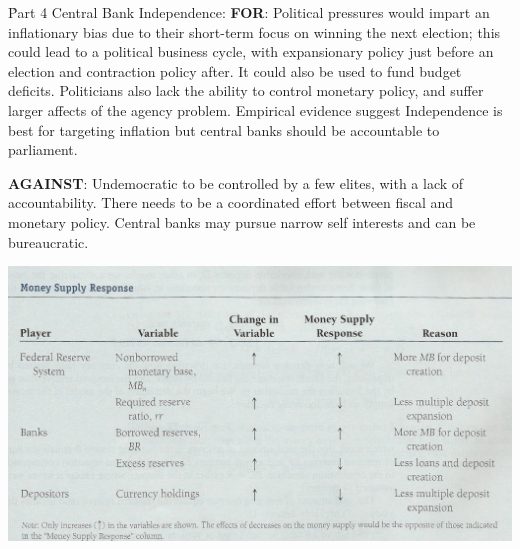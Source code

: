 \documentclass[12pt]{examnotes}
\begin{document}
\h{Part 4}
Central Bank Independence:
\textbf{FOR}: Political pressures would impart an inflationary bias due to their short-term focus on winning the next election; this could lead to a political business cycle, with expansionary policy just before an election and contraction policy after. It could also be used to fund budget deficits. Politicians also lack the ability to control monetary policy, and suffer larger affects of the agency problem. Empirical evidence suggest Independence is best for targeting inflation but central banks should be accountable to parliament.

\textbf{AGAINST}: 
Undemocratic to be controlled by a few elites, with a lack of accountability. There needs to be a coordinated effort between fiscal and monetary policy. Central banks may pursue narrow self interests and can be bureaucratic. 

\begin{center}
  \includegraphics[scale=0.5]{./imgs/moneysupplytable.jpg}
\end{center}
\end{document}
